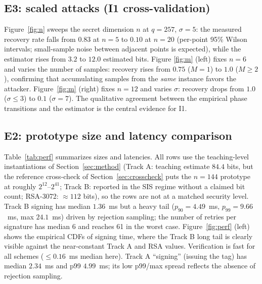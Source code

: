 \documentclass[11pt]{article}
\begin{document}
\subsection{E3: scaled attacks (I1 cross-validation)}\label{sec:results-e3}
Figure~\ref{fig:n} sweeps the secret dimension $n$ at $q=257$, $\sigma=5$: the
measured recovery rate falls from $0.83$ at $n=5$ to $0.10$ at $n=20$ (per-point
95\% Wilson intervals; small-sample noise between adjacent points is expected),
while the estimator rises from $3.2$ to $12.0$ estimated bits.  Figure
\ref{fig:m} (left) fixes $n=6$ and varies the number of samples: recovery rises
from $0.75$ ($M=1$) to $1.0$ ($M\ge 2$), confirming that accumulating samples
from the \emph{same} instance favors the attacker.  Figure~\ref{fig:m} (right)
fixes $n=12$ and varies $\sigma$: recovery drops from $1.0$ ($\sigma\le3$) to
$0.1$ ($\sigma=7$).  The qualitative agreement between the empirical phase
transitions and the estimator is the central evidence for I1.

\subsection{E2: prototype size and latency comparison}
Table~\ref{tab:perf} summarizes sizes and latencies.  All rows use the
teaching-level instantiations of Section~\ref{sec:method} (Track A:
teaching estimate $84.4$ bits, but the reference cross-check of
Section~\ref{sec:crosscheck} puts the $n=144$ prototype at roughly
$2^{12}$--$2^{41}$; Track B: reported in the SIS regime without a claimed bit
count; RSA-3072: $\approx112$ bits), so the rows are not at a matched
security level.  Track B signing has
median $1.36$~ms but a heavy tail ($p_{90}=4.49$~ms, $p_{99}=9.66$~ms,
max $24.1$~ms) driven by rejection sampling; the number of retries per
signature has median 6 and reaches 61 in the worst case.  Figure~\ref{fig:perf}
(left) shows the empirical CDFs of signing time, where the Track B long tail is
clearly visible against the near-constant Track A and RSA values.  Verification
is fast for all schemes ($\le 0.16$~ms median here).  Track A ``signing''
(issuing the tag) has median $2.34$~ms and p99 $4.99$~ms; its low p99/max
spread reflects the absence of rejection sampling.
\end{document}
